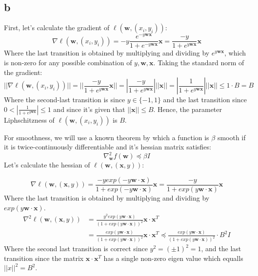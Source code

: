 \subsection*{b}
First, let's calculate the gradient of $\ell\left(\pmb{w}, (x_i, y_i)\right)$:
\begin{equation*}
    \nabla \ell\left(\pmb{w}, (x_i, y_i)\right) = -y \frac{e^{-y \pmb{w} \pmb{x}}}{1+e^{-y \pmb{w} \pmb{x}}} \pmb{x}
    = \frac{-y}{1+e^{y \pmb{w} \pmb{x}}} \pmb{x}
\end{equation*}
Where the last transition is obtained by multiplying and dividing by $e^{y \pmb{w} \pmb{x}}$, which is non-zero for any possible combination of $y, \pmb{w},\pmb{x}$. Taking the standard norm of the gradient:
\begin{equation*}
    ||\nabla \ell\left(\pmb{w}, (x_i, y_i)\right)|| = ||\frac{-y}{1+e^{y \pmb{w} \pmb{x}}} \pmb{x}|| = |\frac{-y}{1+e^{y \pmb{w} \pmb{x}}}| ||\pmb{x}|| = |\frac{1}{1+e^{y \pmb{w} \pmb{x}}}| ||\pmb{x}|| \leq 1 \cdot B = B
\end{equation*}
Where the second-last transition is since $y \in \{-1, 1\}$ and the last transition since $0<|\frac{1}{1+e^{y \pmb{w} \pmb{x}}}| \leq 1$ and since it's given that $||\pmb{x}|| \leq B$. Hence, the parameter Liphschitzness of $\ell\left(\pmb{w}, (x_i, y_i)\right)$ is $B$.


For smoothness, we will use a known theorem by which a function is $\beta$ smooth if it is twice-continuously differentiable and it's hessian matrix satisfies:
\begin{equation*}
    \nabla^2_{\boldsymbol{w}} f(\boldsymbol{w}) \preceq \beta I
\end{equation*}
Let's calculate the hessian of $\ell(\boldsymbol{w}, (\boldsymbol{x}, y))$:

\begin{equation*}
    \nabla \ell(\boldsymbol{w}, (\boldsymbol{x}, y)) = \frac{-yexp(-y\boldsymbol{w}\cdot \boldsymbol{x})}{1+exp(-y\boldsymbol{w}\cdot \boldsymbol{x})} \boldsymbol{x}
    = \frac{-y}{1+exp(y\boldsymbol{w}\cdot \boldsymbol{x})} \boldsymbol{x}
\end{equation*}
Where the last transition is obtained by multiplying and dividing by $exp(y\boldsymbol{w}\cdot \boldsymbol{x})$.
\begin{equation*}
    \begin{split}        
        \nabla^2 \ell(\boldsymbol{w}, (\boldsymbol{x}, y)) &= \frac{y^2 exp(y\boldsymbol{w}\cdot \boldsymbol{x})}{(1+exp(y\boldsymbol{w}\cdot \boldsymbol{x}))^2} \boldsymbol{x} \cdot \boldsymbol{x}^T \\        
        &= \frac{exp(y\boldsymbol{w}\cdot \boldsymbol{x})}{(1+exp(y\boldsymbol{w}\cdot \boldsymbol{x}))^2} \boldsymbol{x} \cdot \boldsymbol{x}^T 
        \preceq \frac{exp(y\boldsymbol{w}\cdot \boldsymbol{x})}{(1+exp(y\boldsymbol{w}\cdot \boldsymbol{x}))^2} \cdot B^2 I
    \end{split}
\end{equation*}
Where the second last transition is correct since $y^2 = (\pm 1)^2 = 1$, and the last transition since the matrix $\boldsymbol{x} \cdot \boldsymbol{x}^T$ has a single non-zero eigen value which equalls $||x||^2=B^2$.


